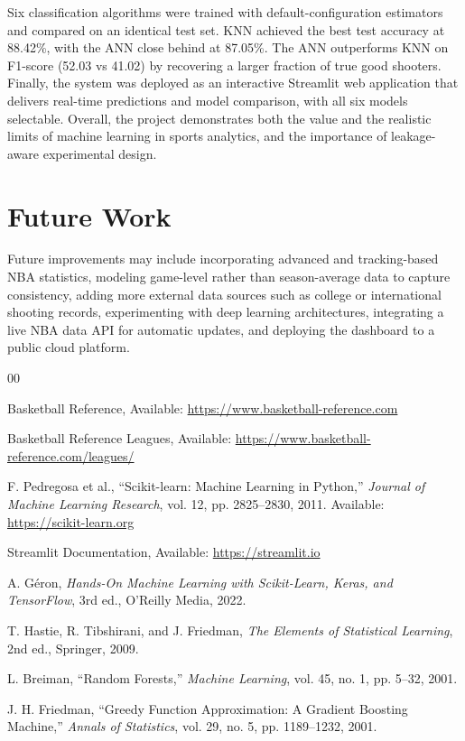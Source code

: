 \documentclass[conference]{IEEEtran}
\begin{document}
Six classification algorithms were trained with default-configuration estimators and compared on an identical test set. KNN achieved the best test accuracy at 88.42\%, with the ANN close behind at 87.05\%. The ANN outperforms KNN on F1-score (52.03 vs 41.02) by recovering a larger fraction of true good shooters. Finally, the system was deployed as an interactive Streamlit web application that delivers real-time predictions and model comparison, with all six models selectable. Overall, the project demonstrates both the value and the realistic limits of machine learning in sports analytics, and the importance of leakage-aware experimental design.


\section{Future Work}

Future improvements may include incorporating advanced and tracking-based NBA statistics, modeling game-level rather than season-average data to capture consistency, adding more external data sources such as college or international shooting records, experimenting with deep learning architectures, integrating a live NBA data API for automatic updates, and deploying the dashboard to a public cloud platform.


\begin{thebibliography}{00}

Basketball Reference,
Available:
\url{https://www.basketball-reference.com}

Basketball Reference Leagues,
Available:
\url{https://www.basketball-reference.com/leagues/}

F. Pedregosa et al.,
``Scikit-learn: Machine Learning in Python,''
\textit{Journal of Machine Learning Research}, vol. 12, pp. 2825--2830, 2011.
Available: \url{https://scikit-learn.org}

Streamlit Documentation,
Available:
\url{https://streamlit.io}

A. G\'eron,
\textit{Hands-On Machine Learning with Scikit-Learn, Keras, and TensorFlow},
3rd ed., O'Reilly Media, 2022.

T. Hastie, R. Tibshirani, and J. Friedman,
\textit{The Elements of Statistical Learning},
2nd ed., Springer, 2009.

L. Breiman,
``Random Forests,''
\textit{Machine Learning}, vol. 45, no. 1, pp. 5--32, 2001.

J. H. Friedman,
``Greedy Function Approximation: A Gradient Boosting Machine,''
\textit{Annals of Statistics}, vol. 29, no. 5, pp. 1189--1232, 2001.

\end{thebibliography}
\end{document}
